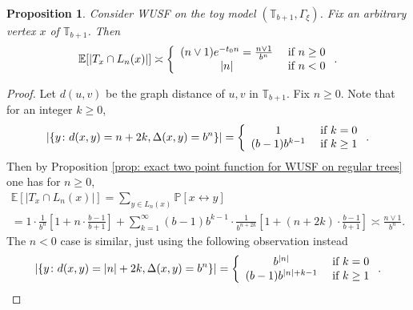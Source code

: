 \documentclass[12pt]{article}
\newtheorem{proposition}[theorem]{Proposition}
\numberwithin{equation}{section}
\newcommand{\be}{\begin{equation}}
\newcommand{\ee}{\end{equation}}
\newcommand{\1}{\mathbf{1}}
\begin{document}
 \begin{proposition}\label{prop: first moment for T_x intersect with a slab in the toy model}
 	Consider WUSF on the toy model $(\mathbb{T}_{b+1},\Gamma_{\xi})$. Fix an arbitrary vertex $x$ of  $\mathbb{T}_{b+1}$. 
 	Then 
 	\be\label{eq: expectation of intersection of T_x with a slab for the toy model} 
 	\mathbb{E}[|T_x\cap L_n(x)|]\asymp
 	\left\{
 	\begin{array}{cc}
 	(n\vee1)e^{-t_0n}=\frac{n\vee1}{b^n} & \textnormal{ if }n\geq 0\\
 |n| & \textnormal{ if }n<0
 	\end{array}
 	\right..
 	\ee
 \end{proposition}
\begin{proof}
	Let $d(u,v)$ be the graph distance of $u,v$ in $\mathbb{T}_{b+1}$.
	Fix $n\geq0$.
	Note that for an integer $k\geq 0$, \[
	|\{y\colon d(x,y)=n+2k, \Delta(x,y)=b^n \}|=
	\left\{
	\begin{array}{cc}
1 & \textnormal{ if }k=0\\
(b-1)b^{k-1} & \textnormal{ if }k\geq1
	\end{array}
	\right..
	\]
Then by Proposition \ref{prop: exact two point function for WUSF on regular trees} one has for $n\geq0$,
\begin{multline*}
	\mathbb{E}[|T_x\cap L_n(x)|]=
	\sum_{y\in L_n(x)}\mathbb{P}[x\leftrightarrow y]\\
=1\cdot\frac{1}{b^n}[1+n\cdot\frac{b-1}{b+1}]+\sum_{k=1}^{\infty}(b-1)b^{k-1}\cdot \frac{1}{b^{n+2k}}[1+(n+2k)\cdot\frac{b-1}{b+1}]
	\asymp\frac{n\vee1}{b^n}.
\end{multline*}	
	The $n<0$ case is similar, just using the following observation instead 
	\[
		|\{y\colon d(x,y)=|n|+2k, \Delta(x,y)=b^n \}|=
	\left\{
	\begin{array}{cc}
	b^{|n|} & \textnormal{ if }k=0\\
	(b-1)b^{|n|+k-1} & \textnormal{ if }k\geq1
	\end{array}
	\right..\qedhere
	\]
\end{proof}
 
\end{document}
